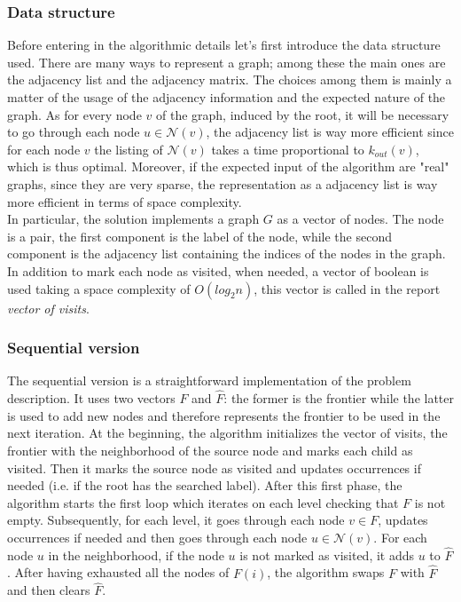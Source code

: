 \subsubsection{Data structure}
Before entering in the algorithmic details let's first introduce the data structure used.
There are many ways to represent a graph; among these the main ones are the adjacency list and the adjacency
matrix. The choices among them is mainly a matter of the usage of the adjacency information and the 
expected nature of the graph. As for every node $v$ of the graph, induced by the root, it will be necessary
to go through each node $u \in \mathcal{N}(v)$, the adjacency list is way more efficient since for each
node $v$ the listing of $\mathcal{N}(v)$ takes a time proportional to $k_{out}(v)$, which is thus optimal.
Moreover, if the expected input of the algorithm are "real" graphs, since they are very sparse, the representation as a adjacency list is way 
more efficient in terms of space complexity.
\\
In particular, the solution implements a graph $G$ as a vector of nodes.
 The node is a pair, the first component is the label of the node, while the second
 component is the adjacency list containing the indices of the nodes in the graph.
In addition to mark each node as visited, when needed, a vector of boolean is used
taking a space complexity of $O(log_2n)$, this vector is called in the report 
\textit{vector of visits}.

 \subsubsection{Sequential version}
\label{sub:seq-version}
The sequential version is a straightforward implementation of the problem
description. It uses two vectors $F$ and $\hat{F}$: the former is the frontier 
while the latter is used to add new nodes and therefore represents the frontier 
to be used in the next iteration. At the beginning, the algorithm initializes the vector of visits,
 the frontier with the neighborhood of the source node and marks each child as visited. Then it marks the source node 
as visited and updates occurrences if needed (i.e. if the root has the searched label). After this first phase,
 the algorithm starts the first loop which iterates on each level checking that $F$ is not empty.
 Subsequently, for each level, it goes through each node $v \in F$, updates occurrences if needed and
 then goes through each node $u \in \mathcal{N}(v)$.
 For each node $u$ in the neighborhood, if the node $u$ is not marked as visited, 
 it adds $u$ to $\hat{F}$. After having exhausted all the nodes of $F(i)$, the algorithm
 swaps $F$ with $\hat{F}$ and then clears $\hat{F}$.

